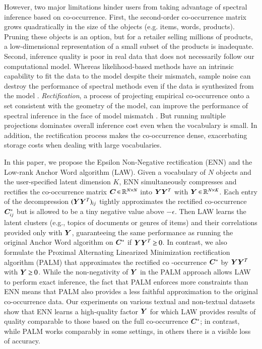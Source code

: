 However, two major limitations hinder users from taking advantage of spectral
inference based on co\hyp{}occurrence. First, the second-order co\hyp{}occurrence
matrix grows quadratically in the size of the objects (e.g. items, words,
products). Pruning these objects is an option, but for a retailer selling
millions of products, a low-dimensional representation of a small subset of the
products is inadequate. Second, inference quality is poor in real data that does
not necessarily follow our computational model. Whereas likelihood-based methods
have an intrinsic capability to fit the data to the model despite their
mismatch, sample noise can destroy the  performance of spectral methods even if
the data is synthesized from the model \cite{kulesza2014low}. {\em
Rectification}, a process of projecting empirical co\hyp{}occurrence onto a set
consistent with the geometry of the model, can improve the performance of
spectral inference in the face of model mismatch \cite{moontae2015nips}. But
running multiple projections dominates overall inference cost even when the
vocabulary is small. In addition, the rectification process makes the 
co\hyp{}occurrence dense, exacerbating storage costs when dealing with large
vocabularies.

In this paper, we propose the Epsilon Non-Negative rectification (ENN) and the
Low-rank Anchor Word algorithm (LAW). Given a vocabulary of $N$ objects and the
user-specified latent dimension $K$, ENN simultaneously compresses and rectifies
the co\hyp{}occurrence matrix $\bm{C} \operatorname{\in} \mathbb{R}^{N \mathrel{\times} N}$ into $\bm{Y} \bm{Y}^T$ with
$\bm{Y} \operatorname{\in} \mathbb{R}^{N \mathrel{\times} K}$. Each entry of the decompression $(\bm{Y} \bm{Y}^T)_{ij}$
tightly approximates the rectified co\hyp{}occurrence $\bm{C}^*_{ij}$ but is
allowed to be a tiny negative value above $-\epsilon$. Then LAW learns the
latent clusters (e.g., topics of documents or genres of items) and their
correlations provided only with $\bm{Y}$, guaranteeing the same performance as
running the original Anchor Word algorithm on $\bm{C}^*$ if $\bm{Y} \bm{Y}^T \mathbin{\geq} 0$. In
contrast, we also formulate the Proximal Alternating Linearized Minimization 
rectification algorithm (PALM) that approximates the rectified co
\hyp{}occurrence $\bm{C}^*$ by $\bm{Y} \bm{Y}^T$ with $\bm{Y} \mathbin{\geq} 0$. While the
non-negativity of $\bm{Y}$ in the PALM approach allows LAW to perform exact
inference, the fact that PALM enforces more constraints than ENN means that PALM
also provides a less faithful approximation to the original co\hyp{}occurrence
data. Our experiments on various textual and non-textual datasets show that ENN
learns a high-quality factor $\bm{Y}$ for which LAW provides results of quality
comparable to those based on the full co\hyp{}occurrence $\bm{C}^*$; in contrast,
while PALM works comparably in some settings, in others there is a visible loss
of accuracy.

